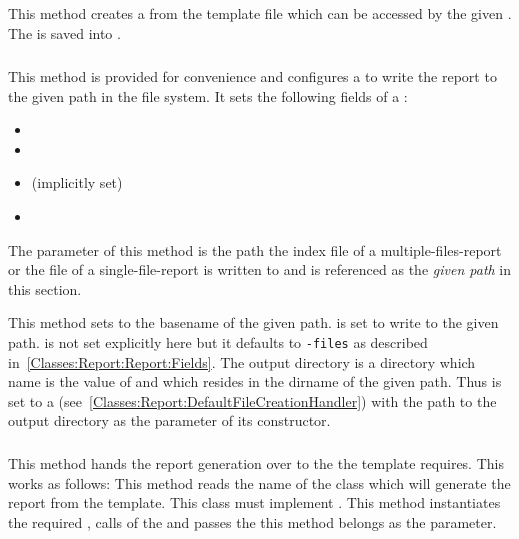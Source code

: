\subparagraph{} \label{Classes:Report:Report:Methods:setTemplateFilepath}

This method creates a  from the template file which can be accessed by the given . The  is saved into .


\subparagraph{} \label{Classes:Report:Report:Methods:setFileSystemPath}

This method is provided for convenience and configures a  to write the report to the given path in the file system. It sets the following fields of a :
\begin{itemize}
\item {}
\item {}
\item {} (implicitly set)
\item {}
\end{itemize}

The parameter of this method is the path the index file of a multiple-files-report or the file of a single-file-report is written to and is referenced as the \emph{given path} in this section.

This method sets  to the basename of the given path.  is set to write to the given path.  is not set explicitly here but it defaults to \mbox{\texttt{-files}} as described in~\ref{Classes:Report:Report:Fields}. The output directory is a directory which name is the value of  and which resides in the dirname of the given path. Thus  is set to a  (see~\ref{Classes:Report:DefaultFileCreationHandler}) with the path to the output directory as the parameter of its constructor.


\subparagraph{}

This method hands the report generation over to the  the template requires. This works as follows: This method reads the name of the class which will generate the
report from the template. This class must implement . This method instantiates the required , calls  of the  and passes the  this method belongs as the parameter. 


